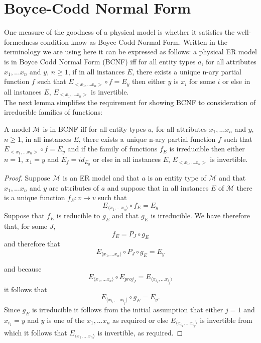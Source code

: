 \documentclass[10pt,a4paper]{article}
\newcommand{\genericmodel}{\mathcal{M}}
\newcommand{\Vtype}{v}
\begin{document}
\section{Boyce-Codd Normal Form}
\noindent One measure of the goodness of a physical model is whether it satisfies the well-formedness condition know as Boyce Codd Normal Form.
Written in the terminology we are using here it can be expressed as follows: a physical ER model is in Boyce Codd Normal Form (BCNF) iff
for all entity types $a$, for all attributes $x_1,...x_n$ and $y$, $n \geq 1$, if in all instances $E$, there exists a unique n-ary partial function
$f$ such that $E_{<x_1,...x_n>} \circ f = E_y$ then either $y$ is $x_i$ for some $i$ or else in all instances
$E$, $E_{<x_1,...x_n>}$ is invertible. \\

\noindent The next lemma simplifies the requirement for showing BCNF to consideration of irreducible families of functions:
\begin{lemma}
A model $\genericmodel$ is in BCNF iff
for all entity types $a$, for all attributes $x_1,...x_n$ and $y$, $n \geq 1$, 
in all instances $E$, there exists a unique n-ary partial function
$f$ such that $E_{<x_1,...x_n>} \circ f = E_y$ and if the family of functions $f_E$ is irreducible then either 
$n=1$, $x_1=y$ and $E_f=id_{E_y}$
 or else in all instances
$E$, $E_{<x_1,...x_n>}$ is invertible. 
\end{lemma}
\begin{proof}
Suppose $\genericmodel$ is an ER model and that $a$ is an entity type of $\genericmodel$ and that $x_1,...x_n$ and $y$ 
are attributes of $a$ and suppose that in all instances $E$ of $\genericmodel$ there is a unique function $f_E : \Vtype \rightarrow \Vtype$
such that
$$
E_{\langle x_1,...x_n \rangle} \circ f_E = E_y
$$
Suppose that $f_E$ is reducible to $g_E$ and that  $g_E$ is irreducible. We have therefore that, for some $J$,
$$
f_E=P_J \circ g_E
$$ 
and therefore that
$$
E_{\langle x_1,...x_n \rangle} \circ P_J \circ g_E = E_y
$$

\noindent and because 
$$
E_{\langle x_1,...x_n \rangle} \circ E_{proj_J} = E_{\langle x_{i_1},...x_{i_j} \rangle}
$$
it follows that
$$
E_{\langle x_{i_1},...x_{i_j} \rangle} \circ g_E = E_y.
$$
Since $g_E$ is irreducible it follows from the initial assumption that either $j=1$ and $x_{i_1}=y$ and $y$ is one of the 
$x_1,...x_n$ as required or else $E_{\langle x_{i_1},...x_{i_j} \rangle}$ is invertible from which it follows that 
$E_{\langle x_1,...x_n \rangle}$ is invertible, as required.
\end{proof}
\end{document}
